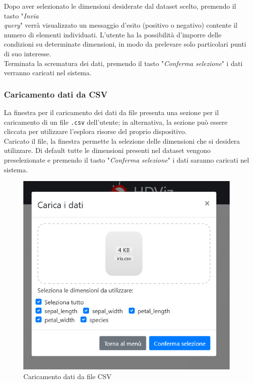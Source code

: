 Dopo aver selezionato le dimensioni desiderate dal dataset scelto, premendo il tasto "\textit{Invia\\ query}" verrà visualizzato un messaggio d'esito (positivo o negativo) contente il numero di elementi individuati. L'utente ha la possibilità d'imporre delle condizioni su determinate dimensioni, in modo da prelevare solo particolari punti di suo interesse.\\ Terminata la scrematura dei dati, premendo il tasto "\textit{Conferma selezione}" i dati verranno caricati nel sistema. 
\newpage
\subsubsection{Caricamento dati da CSV}
	La finestra per il caricamento dei dati da file  presenta una sezione  per il caricamento di un file \texttt{.csv} dell'utente; in alternativa, la sezione può essere cliccata per utilizzare l'esplora risorse del proprio dispositivo.\\ Caricato il file, la finestra permette la selezione delle dimensioni che si desidera utilizzare. Di default tutte le dimensioni presenti nel dataset vengono preselezionate e premendo il tasto "\textit{Conferma selezione}" i dati saranno caricati nel sistema.
	\begin{figure}[H]
		\includegraphics[scale=0.7]{Images/CaricamentoCSV.png}
		\centering
		\caption{Caricamento dati da file CSV}
	\end{figure}

